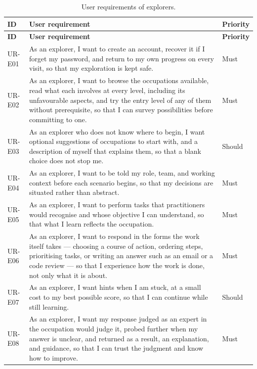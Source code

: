{\small
\begin{longtable}{|>{\raggedright\arraybackslash}p{}|>{\raggedright\arraybackslash}p{}|>{\raggedright\arraybackslash}p{}|}
\caption{User requirements of explorers.} \\
\hline
\textbf{ID} & \textbf{User requirement} & \textbf{Priority} \\ \hline
\endfirsthead
\hline
\textbf{ID} & \textbf{User requirement} & \textbf{Priority} \\ \hline
\endhead
UR-E01 & As an explorer, I want to create an account, recover it if I forget my password, and return to my own progress on every visit, so that my exploration is kept safe. & Must \\ \hline
UR-E02 & As an explorer, I want to browse the occupations available, read what each involves at every level, including its unfavourable aspects, and try the entry level of any of them without prerequisite, so that I can survey possibilities before committing to one. & Must \\ \hline
UR-E03 & As an explorer who does not know where to begin, I want optional suggestions of occupations to start with, and a description of myself that explains them, so that a blank choice does not stop me. & Should \\ \hline
UR-E04 & As an explorer, I want to be told my role, team, and working context before each scenario begins, so that my decisions are situated rather than abstract. & Must \\ \hline
UR-E05 & As an explorer, I want to perform tasks that practitioners would recognise and whose objective I can understand, so that what I learn reflects the occupation. & Must \\ \hline
UR-E06 & As an explorer, I want to respond in the forms the work itself takes --- choosing a course of action, ordering steps, prioritising tasks, or writing an answer such as an email or a code review --- so that I experience how the work is done, not only what it is about. & Must \\ \hline
UR-E07 & As an explorer, I want hints when I am stuck, at a small cost to my best possible score, so that I can continue while still learning. & Should \\ \hline
UR-E08 & As an explorer, I want my response judged as an expert in the occupation would judge it, probed further when my answer is unclear, and returned as a result, an explanation, and guidance, so that I can trust the judgment and know how to improve. & Must \\ \hline

\end{longtable}}
